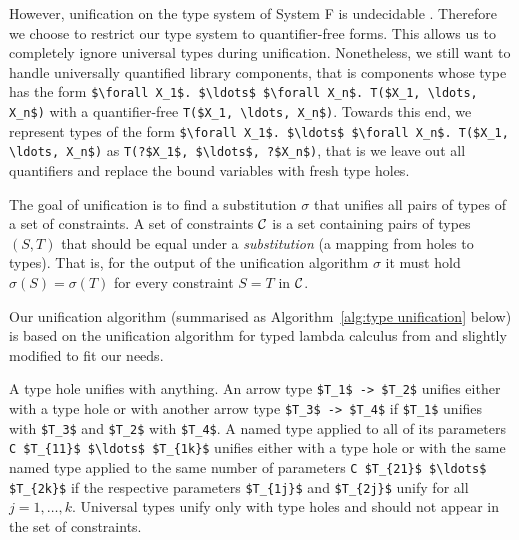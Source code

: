 However, unification on the type system of System F is undecidable \cite{Huet1975}.
Therefore we choose to restrict our type system to quantifier-free forms.
This allows us to completely ignore universal types during unification. Nonetheless, we still want to handle universally quantified library components, that is components whose type has the form \lstinline?$\forall X_1$. $\ldots$ $\forall X_n$. T($X_1, \ldots, X_n$)? with a quantifier-free \lstinline?T($X_1, \ldots, X_n$)?. Towards this end, we represent types of the form \lstinline?$\forall X_1$. $\ldots$ $\forall X_n$. T($X_1, \ldots, X_n$)? as \lstinline!T(?$X_1$, $\ldots$, ?$X_n$)!, that is we leave out all quantifiers and replace the bound variables with fresh type holes.

The goal of unification is to find a substitution $\sigma$ that unifies all pairs of types of a set of constraints.
A set of constraints $\mathcal{C}$ is a set containing pairs of types $(S, T)$ that should be equal under a \emph{substitution} (a mapping from holes to types). That is, for the output of the unification algorithm $\sigma$ it must hold $\sigma(S) = \sigma(T)$ for every constraint $S = T$ in $\mathcal{C}$.

Our unification algorithm (summarised as Algorithm~\ref{alg:type unification} below) is based on the unification algorithm for typed lambda calculus from \cite{pierce2002types} and slightly modified to fit our needs.

A type hole unifies with anything. An arrow type \lstinline?$T_1$ -> $T_2$? unifies either with a type hole or with another arrow type \lstinline?$T_3$ -> $T_4$? if \lstinline?$T_1$? unifies with \lstinline?$T_3$? and \lstinline?$T_2$? with \lstinline?$T_4$?. A named type applied to all of its parameters \lstinline?C $T_{11}$ $\ldots$ $T_{1k}$? unifies either with a type hole or with the same named type applied to the same number of parameters \lstinline?C $T_{21}$ $\ldots$ $T_{2k}$? if the respective parameters \lstinline?$T_{1j}$? and \lstinline?$T_{2j}$? unify for all $j = 1, \ldots, k$. Universal  types unify only with type holes and should not appear in the set of constraints.

